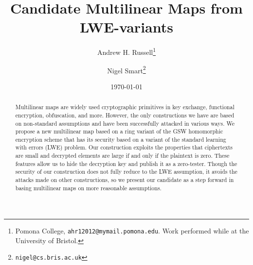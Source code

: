 \documentclass[11pt]{article}
\title{Candidate Multilinear Maps from LWE-variants}
\author{Andrew H. Russell\thanks{Pomona College, \texttt{ahr12012@mymail.pomona.edu}.  Work performed while at the University of Bristol.} \and Nigel Smart\thanks{\texttt{nigel@cs.bris.ac.uk}}}
\date{\today}
\begin{document}
\maketitle
\begin{abstract}
Multilinear maps are widely used cryptographic primitives in key exchange, functional encryption, obfuscation, and more.  However, the only constructions we have are based on non-standard assumptions and have been successfully attacked in various ways.  We propose a new multilinear map based on a ring variant of the GSW homomorphic encryption scheme that has its security based on a variant of the standard learning with errors (LWE) problem.  Our construction exploits the properties that ciphertexts are small and decrypted elements are large if and only if the plaintext is zero.  These features allow us to hide the decryption key and publish it as a zero-tester. Though the security of our construction does not fully reduce to the LWE assumption, it avoids the attacks made on other constructions, so we present our candidate as a step forward in basing multilinear maps on more reasonable assumptions. 
\end{abstract}







\newpage

%
%




\end{document}
